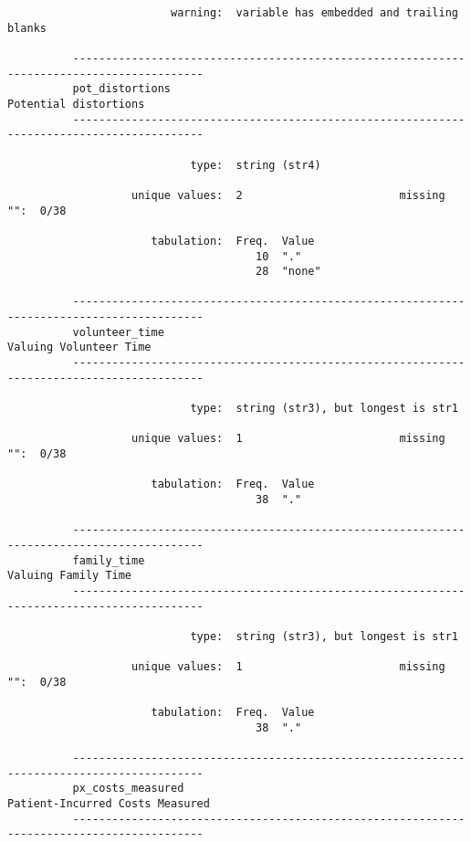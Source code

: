 \documentclass{article}
\begin{document}
\begin{verbatim}
                         warning:  variable has embedded and trailing blanks
          
          ------------------------------------------------------------------------------------------
          pot_distortions                                                      Potential distortions
          ------------------------------------------------------------------------------------------
          
                            type:  string (str4)
          
                   unique values:  2                        missing "":  0/38
          
                      tabulation:  Freq.  Value
                                      10  "."
                                      28  "none"
          
          ------------------------------------------------------------------------------------------
          volunteer_time                                                      Valuing Volunteer Time
          ------------------------------------------------------------------------------------------
          
                            type:  string (str3), but longest is str1
          
                   unique values:  1                        missing "":  0/38
          
                      tabulation:  Freq.  Value
                                      38  "."
          
          ------------------------------------------------------------------------------------------
          family_time                                                            Valuing Family Time
          ------------------------------------------------------------------------------------------
          
                            type:  string (str3), but longest is str1
          
                   unique values:  1                        missing "":  0/38
          
                      tabulation:  Freq.  Value
                                      38  "."
          
          ------------------------------------------------------------------------------------------
          px_costs_measured                                          Patient-Incurred Costs Measured
          ------------------------------------------------------------------------------------------
          

\end{verbatim}
\end{document}
